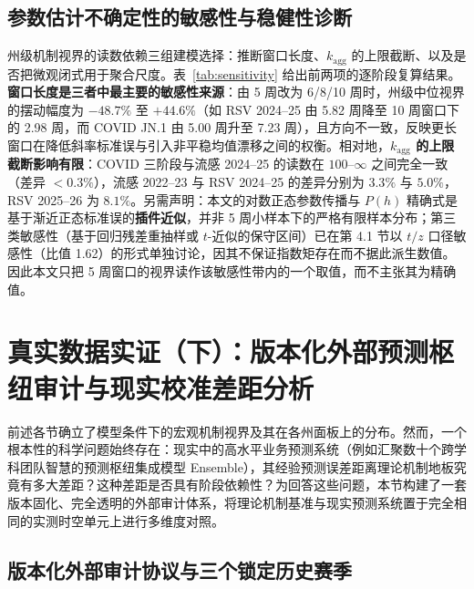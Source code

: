 \documentclass[11pt,a4paper]{article}
\theoremstyle{plain}
\theoremstyle{definition}
\begin{document}
\subsection{参数估计不确定性的敏感性与稳健性诊断}\label{sec:sensitivity}

州级机制视界的读数依赖三组建模选择：推断窗口长度、$k_{\text{agg}}$ 的上限截断、以及是否把微观闭式用于聚合尺度。表~\ref{tab:sensitivity} 给出前两项的逐阶段复算结果。\textbf{窗口长度是三者中最主要的敏感性来源}：由 5 周改为 6/8/10 周时，州级中位视界的摆动幅度为 $-48.7\%$ 至 $+44.6\%$（如 RSV 2024--25 由 5.82 周降至 10 周窗口下的 2.98 周，而 COVID JN.1 由 5.00 周升至 7.23 周），且方向不一致，反映更长窗口在降低斜率标准误与引入非平稳均值漂移之间的权衡。相对地，\textbf{$k_{\text{agg}}$ 的上限截断影响有限}：COVID 三阶段与流感 2024--25 的读数在 $100$--$\infty$ 之间完全一致（差异 $<0.3\%$），流感 2022--23 与 RSV 2024--25 的差异分别为 $3.3\%$ 与 $5.0\%$，RSV 2025--26 为 $8.1\%$。另需声明：本文的对数正态参数传播与 $P(h)$ 精确式是基于渐近正态标准误的\textbf{插件近似}，并非 5 周小样本下的严格有限样本分布；第三类敏感性（基于回归残差重抽样或 $t$-近似的保守区间）已在第 4.1 节以 $t/z$ 口径敏感性（比值 1.62）的形式单独讨论，因其不保证指数矩存在而不据此派生数值。因此本文只把 5 周窗口的视界读作该敏感性带内的一个取值，而不主张其为精确值。


\section{真实数据实证（下）：版本化外部预测枢纽审计与现实校准差距分析}\label{sec:hub_audit}

前述各节确立了模型条件下的宏观机制视界及其在各州面板上的分布。然而，一个根本性的科学问题始终存在：现实中的高水平业务预测系统（例如汇聚数十个跨学科团队智慧的预测枢纽集成模型 Ensemble），其经验预测误差距离理论机制地板究竟有多大差距？这种差距是否具有阶段依赖性？为回答这些问题，本节构建了一套版本固化、完全透明的外部审计体系，将理论机制基准与现实预测系统置于完全相同的实测时空单元上进行多维度对照。

\subsection{版本化外部审计协议与三个锁定历史赛季}\label{sec:flusight_protocol}
\end{document}
